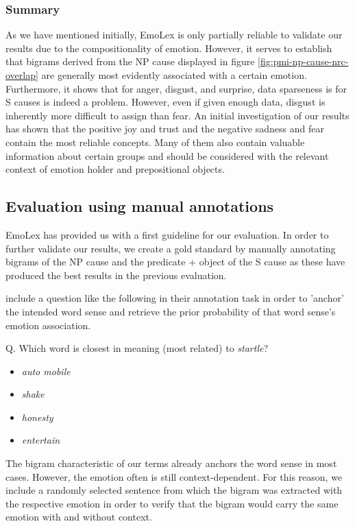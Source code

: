 \subsubsection{Summary}

As we have mentioned initially, EmoLex is only partially reliable to validate our results due to the compositionality of emotion. However, it serves to establish that bigrams derived from the NP cause displayed in figure \ref{fig:pmi-np-cause-nrc-overlap} are generally most evidently associated with a certain emotion. Furthermore, it shows that for anger, disgust, and surprise, data sparseness is for S causes is indeed a problem. However, even if given enough data, disgust is inherently more difficult to assign than fear. An initial investigation of our results has shown that the positive joy and trust and the negative sadness and fear contain the most reliable concepts. Many of them also contain valuable information about certain groups and should be considered with the relevant context of emotion holder and prepositional objects.

\subsection{Evaluation using manual annotations}

EmoLex has provided us with a first guideline for our evaluation. In order to further validate our results, we create a gold standard by manually annotating bigrams of the NP cause and the predicate + object of the S cause as these have produced the best results in the previous evaluation.

\citeauthor{nrc} include a question like the following in their annotation task in order to 'anchor' the intended word sense and retrieve the prior probability of that word sense's emotion association.

Q. Which word is closest in meaning (most related) to \textit{startle}?
\begin{itemize}[noitemsep,nolistsep]
	\item \textit{auto mobile}
	\item \textit{shake}
	\item \textit{honesty}
	\item \textit{entertain}
\end{itemize}

The bigram characteristic of our terms already anchors the word sense in most cases. However, the emotion often is still context-dependent. For this reason, we include a randomly selected sentence from which the bigram was extracted with the respective emotion in order to verify that the bigram would carry the same emotion with and without context.

